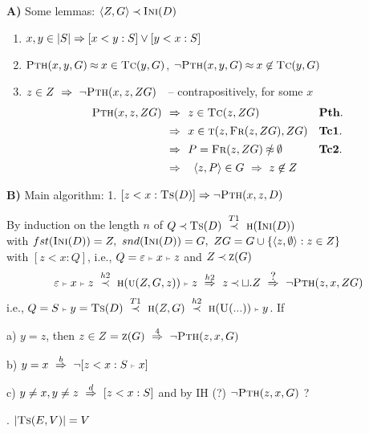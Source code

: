 \documentclass[leqno]{article}
\newcommand{\func}[1]{\mbox{\sc #1}}
\newcommand{\f}[1]{\func{#1}}
\newcommand{\aft}[3]{[#1<#2:#3]}
\newcommand{\by}[2]{\ \stackrel{#2}{#1}\ }
\newcommand{\who}{\mbox{?}}
\begin{document}
%
{\bf A)} Some  lemmas: $\<Z,G\>\Incl \f{Ini}(D)$
 \begin{enumerate}
  \item $x,y\in|S| \impl \aft xyS \lor \aft yxS$
  \item $\f{Pth}(x,y,G)\Eq x\in\f{Tc}(y,G)$,\hfill
 $\neg\f{Pth}(x,y,G)\Eq x\not\in\f{Tc}(y,G)$
\item 
$z\in Z\ \impl\ \neg \f{Pth}(x,z,ZG)$\ \ -- contrapositively, for some $x$ \\
\[\begin{array}{r@{\ \ \impl\ \ }l@{\ \ \ }l}
\f{Pth}(x,z,ZG) & z\in \f{Tc}(z,ZG) & {\bf Pth.} \\[1ex]
       & x\in \f{t}(z,\f{Fr}(z,ZG),ZG) & {\bf Tc1.} \\[1ex]
       & P=\f{Fr}(z,ZG)\notEq\es & {\bf Tc2.} \\[1ex]
       & \multicolumn{2}{l}{\<z,P\>\in G\ \impl\  z\not\in Z}
\end{array}
\]
 \end{enumerate}
{\bf B)} Main algorithm:
1. $\aft zx{\f{Ts}(D)}\impl \neg \f{Pth}(x,z,D)$ 

By induction on the length $n$ of $Q\Incl\f{Ts}(D)\by\Incl{T1}\f{h}(\f{Ini}(D))$ \\
with
$fst(\f{Ini}(D))= Z,\ snd(\f{Ini}(D))=G,\ ZG=G\cup \{\<z,\es\>:z\in Z\}$ \\
 with $\aft zxQ$, i.e., $Q=\varepsilon\mathrel{\scriptscriptstyle{\vdash}} x\mathrel{\scriptscriptstyle{\vdash}} z$ and $Z\Incl \f z(G)$
\[\estr\app x\app z \by\Incl{h2} \f h(\f u(Z,G,z))\app z
\by\impl{h2} z\Incl\ch.Z  \by\impl{\who}\neg\f{Pth}(z,x,ZG) \]
%
 i.e., $Q=S\app y
 = \f{Ts}(D) \by\Incl{T1} \f h(Z,G) \by\Incl{h2} \f h(\f U(...))\app y$. If 

a) $y=z$, then $z\in Z=\f z(G)\by\impl 4 \neg\f{Pth}(z,x,G)$ 

b) $y=x \by\impl{b} \neg\aft zx{S\app x}$ 

c) $y\not=x, y\not=z \by\impl{d}\aft zxS$ and by IH (?) $\neg\f{Pth}(z,x,G)$ ?

. $|\f{Ts}(E,V)|  =  V $




\newpage
\end{document}
